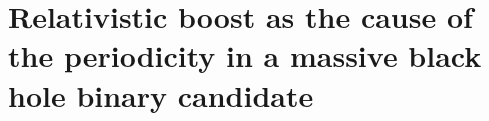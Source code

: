 \chapter[Relativistic boost]{Relativistic boost as the cause of the periodicity in a massive black hole binary candidate}
\label{ch:PG1302_b}
\let\thefootnote\relax{}








%








% 



